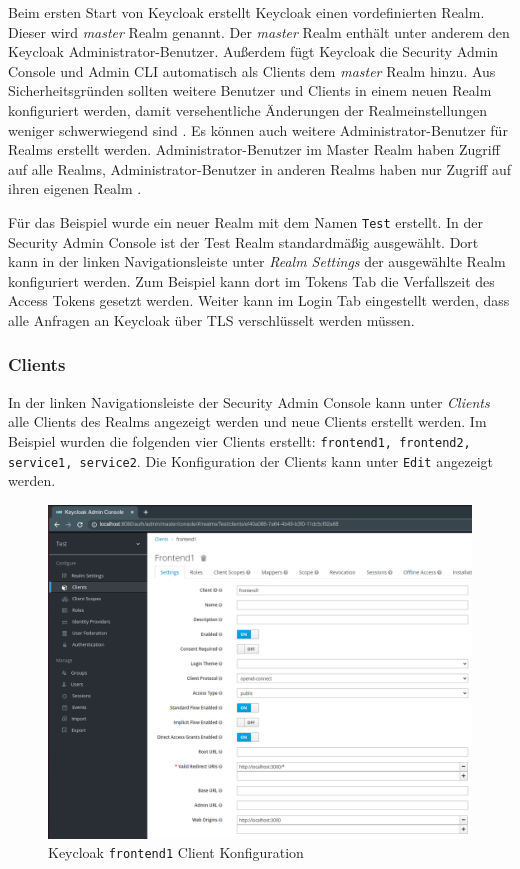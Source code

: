 Beim ersten Start von Keycloak erstellt Keycloak einen vordefinierten Realm. Dieser wird \textit{master} Realm genannt. Der \textit{master} Realm enthält unter anderem den Keycloak Administrator-Benutzer. Außerdem fügt Keycloak die Security Admin Console und Admin CLI automatisch als Clients dem \textit{master} Realm hinzu. Aus Sicherheitsgründen sollten weitere Benutzer und Clients in einem neuen Realm konfiguriert werden, damit versehentliche Änderungen der Realmeinstellungen weniger schwerwiegend sind \cite[Master Realm]{keycloakDocs}. Es können auch weitere Administrator-Benutzer für Realms erstellt werden. Administrator-Benutzer im Master Realm haben Zugriff auf alle Realms,  Administrator-Benutzer in anderen Realms haben nur Zugriff auf ihren eigenen Realm \cite[Master Realm]{keycloakDocs}.

Für das Beispiel wurde ein neuer Realm mit dem Namen \texttt{Test} erstellt. In der Security Admin Console ist der Test Realm standardmäßig ausgewählt. Dort kann in der linken Navigationsleiste unter \textit{Realm Settings} der ausgewählte Realm konfiguriert werden. Zum Beispiel kann dort im Tokens Tab die Verfallszeit des Access Tokens gesetzt werden. Weiter kann im Login Tab eingestellt werden, dass alle Anfragen an Keycloak über TLS verschlüsselt werden müssen.

\subsubsection{Clients}

In der linken Navigationsleiste der Security Admin Console kann unter \textit{Clients} alle Clients des Realms angezeigt werden und neue Clients erstellt werden. Im Beispiel wurden die folgenden vier Clients erstellt: \texttt{frontend1, frontend2, service1, service2}. Die Konfiguration der Clients kann unter \texttt{Edit} angezeigt werden.

\begin{figure}[!ht]
	\centering
	\includegraphics[width=1\textwidth]{Images/Ebert/KeycloakClientConfig.PNG}
	\caption{Keycloak \texttt{frontend1} Client Konfiguration}
	\label{fig:EB_Keycloak frontend1 Client Konfiguration}
\end{figure}

